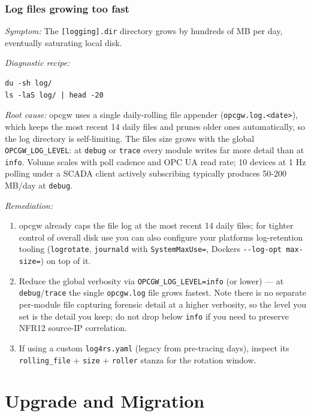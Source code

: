 \subsection{Log files growing too fast}\label{sec-issue-log-growth}

\emph{Symptom:} The \texttt{{[}logging{]}.dir} directory grows by hundreds of MB per day, eventually saturating local disk.

\emph{Diagnostic recipe:}

\begin{lstlisting}
du -sh log/
ls -laS log/ | head -20
\end{lstlisting}

\emph{Root cause:} opcgw uses a single daily-rolling file appender (\texttt{opcgw.log.\textless{}date\textgreater{}}), which keeps the most recent 14 daily files and prunes older ones automatically, so the log directory is self-limiting. The file\textquotesingle s size grows with the global \texttt{OPCGW\_LOG\_LEVEL}: at \texttt{debug} or \texttt{trace} every module writes far more detail than at \texttt{info}. Volume scales with poll cadence and OPC UA read rate; 10 devices at 1 Hz polling under a SCADA client actively subscribing typically produces 50-200 MB/day at \texttt{debug}.

\emph{Remediation:}

\begin{enumerate}
\def\labelenumi{\arabic{enumi}.}
\item
  opcgw already caps the file log at the most recent 14 daily files; for tighter control of overall disk use you can also configure your platform\textquotesingle s log-retention tooling (\texttt{logrotate}, \texttt{journald} with \texttt{SystemMaxUse=}, Docker\textquotesingle s \texttt{-\/-log-opt\ max-size=}) on top of it.
\item
  Reduce the global verbosity via \texttt{OPCGW\_LOG\_LEVEL=info} (or lower) --- at \texttt{debug}/\texttt{trace} the single \texttt{opcgw.log} file grows fastest. Note there is no separate per-module file capturing forensic detail at a higher verbosity, so the level you set is the detail you keep; do not drop below \texttt{info} if you need to preserve NFR12 source-IP correlation.
\item
  If using a custom \texttt{log4rs.yaml} (legacy from pre-tracing days), inspect its \texttt{rolling\_file} + \texttt{size} + \texttt{roller} stanza for the rotation window.
\end{enumerate}

\chapter{Upgrade and Migration}\label{ch-upgrade}

